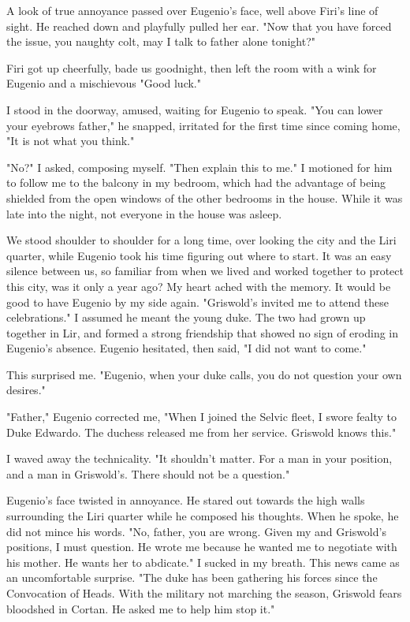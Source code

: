 \documentclass{article}
\begin{document}
A look of true annoyance passed over Eugenio's face, well above Firi's line of sight. He reached down and playfully pulled her ear. "Now that you have forced the issue, you naughty colt, may I talk to father alone tonight?"

Firi got up cheerfully, bade us goodnight, then left the room with a wink for Eugenio and a mischievous "Good luck."

I stood in the doorway, amused, waiting for Eugenio to speak. "You can lower your eyebrows father," he snapped, irritated for the first time since coming home, "It is not what you think."

"No?" I asked, composing myself. "Then explain this to me." I motioned for him to follow me to the balcony in my bedroom, which had the advantage of being shielded from the open windows of the other bedrooms in the house. While it was late into the night, not everyone in the house was asleep.

We stood shoulder to shoulder for a long time, over looking the city and the Liri quarter, while Eugenio took his time figuring out where to start. It was an easy silence between us, so familiar from when we lived and worked together to protect this city, was it only a year ago? My heart ached with the memory. It would be good to have Eugenio by my side again. "Griswold's invited me to attend these celebrations." I assumed he meant the young duke. The two had grown up together in Lir, and formed a strong friendship that showed no sign of eroding in Eugenio's absence. Eugenio hesitated, then said, "I did not want to come."

This surprised me. "Eugenio, when your duke calls, you do not question your own desires."

"Father," Eugenio corrected me, "When I joined the Selvic fleet, I swore fealty to Duke Edwardo. The duchess released me from her service. Griswold knows this."

I waved away the technicality. "It shouldn't matter. For a man in your position, and a man in Griswold's. There should not be a question."

Eugenio's face twisted in annoyance. He stared out towards the high walls surrounding the Liri quarter while he composed his thoughts. When he spoke, he did not mince his words. "No, father, you are wrong. Given my and Griswold's positions, I must question. He wrote me because he wanted me to negotiate with his mother. He wants her to abdicate." I sucked in my breath. This news came as an uncomfortable surprise. "The duke has been gathering his forces since the Convocation of Heads. With the military not marching the season, Griswold fears bloodshed in Cortan. He asked me to help him stop it."
\end{document}
